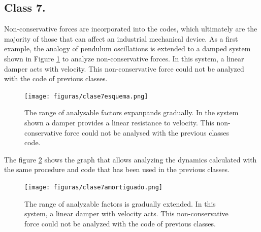 \subsection{Class 7.} Non-conservative forces are incorporated into the codes, which ultimately are the majority of those that can affect an industrial mechanical device. As a first example, the analogy of pendulum oscillations is extended to a damped system shown in Figure \ref{fig:clase7esquema} to analyze non-conservative forces. In this system, a linear damper acts with velocity. This non-conservative force could not be analyzed with the code of previous classes.
\begin{figure}[!ht]
	\centering
	\texttt{[image: figuras/clase7esquema.png]}
	\caption{The range of analysable factors expanpands gradually. In the system shown a damper provides a linear resistance to velocity. This non-conservative force could not be analysed with the previous classes code.}
	\label{fig:clase7esquema}
\end{figure}


The figure \ref{fig:clase7amo} shows the graph that allows analyzing the dynamics calculated with the same procedure and code that has been used in the previous classes.

\begin{figure}[!ht]
\centering
\texttt{[image: figuras/clase7amortiguado.png]}
\caption{The range of analyzable factors is gradually extended. In this system, a linear damper with velocity acts. This non-conservative force could not be analyzed with the code of previous classes.}
\label{fig:clase7amo}
\end{figure}




